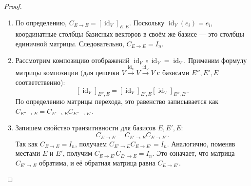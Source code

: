 \begin{proof}
	\begin{enumerate}
		\item По определению, $C_{E\to E} = [\operatorname{id}_V]_{E,E}$. Поскольку $\operatorname{id}_V(e_i) = e_i$, координатные столбцы базисных векторов в своём же базисе --- это столбцы единичной матрицы. Следовательно, $C_{E\to E} = I_n$.
		
		\item Рассмотрим композицию отображений $\operatorname{id}_V \circ \operatorname{id}_V = \operatorname{id}_V$. Применим формулу матрицы композиции (для цепочки $V \xrightarrow{\operatorname{id}_V} V \xrightarrow{\operatorname{id}_V} V$ с базисами $E'', E', E$ соответственно):
		\[
		[\operatorname{id}_V]_{E'',E} = [\operatorname{id}_V]_{E',E} [\operatorname{id}_V]_{E'',E'}.
		\]
		По определению матрицы перехода, это равенство записывается как $C_{E''\to E} = C_{E'\to E} C_{E''\to E'}$.
		
		\item Запишем свойство транзитивности для базисов $E, E', E$:
		\[
		C_{E\to E} = C_{E'\to E} C_{E\to E'}.
		\]
		Так как $C_{E\to E} = I_n$, получаем $C_{E'\to E} C_{E\to E'} = I_n$. Аналогично, поменяв местами $E$ и $E'$, получим $C_{E\to E'} C_{E'\to E} = I_n$. Это означает, что матрица $C_{E'\to E}$ обратима, и её обратная матрица равна $C_{E\to E'}$.
	\end{enumerate}
\end{proof}
